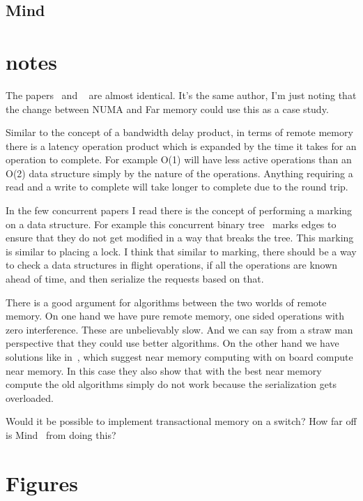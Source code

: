 \subsection{Mind}



\section{notes}

The papers~\cite{one-sided-hash} and ~\cite{write-op-hash} are almost
identical. It's the same author, I'm just noting that the change between NUMA
and Far memory could use this as a case study.

Similar to the concept of a bandwidth delay product, in terms of remote memory
there is a latency operation product which is expanded by the time it takes for
an operation to complete. For example O(1) will have less active operations than
an O(2) data structure simply by the nature of the operations. Anything requiring
a read and a write to complete will take longer to complete due to the round
trip.

In the few concurrent papers I read there is the concept of performing a marking
on a data structure. For example this concurrent binary
tree~\cite{fast-concurrent-bin} marks edges to ensure that they do not get
modified in a way that breaks the tree. This marking is similar to placing a
lock. I think that similar to marking, there should be a way to check a data
structures in flight operations, if all the operations are known ahead of time,
and then serialize the requests based on that.

There is a good argument for algorithms between the two worlds of remote memory.
On one hand we have pure remote memory, one sided operations with zero
interference. These are unbelievably slow. And we can say from a straw man
perspective that they could use better algorithms. On the other hand we have
solutions like in~\cite{design-far-memory-struct,near-memory-structs}, which
suggest near memory computing with on board compute near memory. In this case
they also show that with the best near memory compute the old algorithms simply
do not work because the serialization gets overloaded.

Would it be possible to implement transactional memory on a switch? How far off
is Mind~\cite{mind} from doing this?

\section{Figures}





